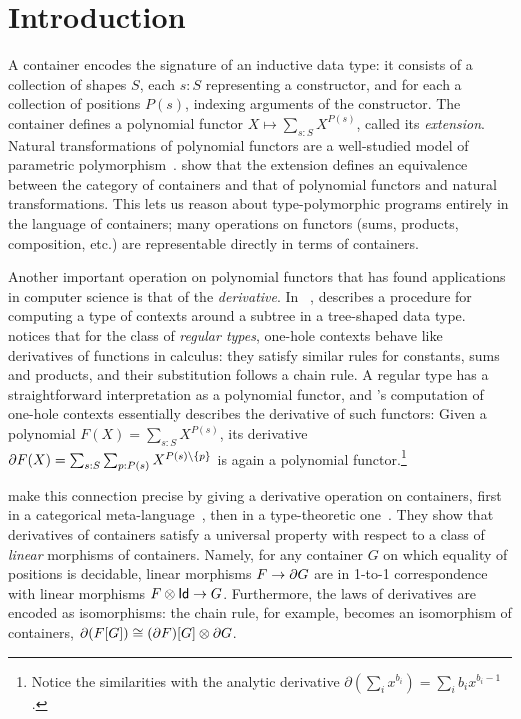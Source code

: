 \section{Introduction}

A container \cite{AbbottEtAl2005ContainersConstructingstrictly} encodes the signature of an inductive data type:
it consists of a collection of shapes \( S \), each \( s : S \) representing a constructor,
and for each a collection of positions \( P(s) \), indexing arguments of the constructor.
The container defines a polynomial functor \( X \mapsto \sum_{s : S} X^{P(s)} \),
called its \emph{extension}.
Natural transformations of polynomial functors are a well-studied model of parametric polymorphism~\cite{BainbridgeEtAl1990Functorialpolymorphism}.
 show that
the extension defines an equivalence between the category of containers and that of polynomial functors and natural transformations.
This lets us reason about type-polymorphic programs entirely in the language of containers;
many operations on functors (sums, products, composition, etc.) are representable directly in terms of containers.

Another important operation on polynomial functors that has found applications in computer science is that of the \emph{derivative}.
In ~\cite{Huet1997Zipper}, \citeauthor{Huet1997Zipper} describes a procedure for computing a type of contexts around a subtree in a tree-shaped data type.
~\cite{McBride2001DerivativeRegularType}
notices that for the class of \emph{regular types}, one-hole contexts behave like derivatives of functions in calculus:
they satisfy similar rules for constants, sums and products, and their substitution follows a chain rule.
A regular type has a straightforward interpretation as a polynomial functor,
and \citeauthor{McBride2001DerivativeRegularType}'s computation of one-hole contexts essentially describes the derivative of such functors:
Given a polynomial \( F(X) = \sum_{s : S} X^{P(s)} \),
its derivative
\(
  \partial{F}(X) = \sum_{s : S} \sum_{p : P(s)} X^{P(s) \setminus \{ p \}}
\)
is again a polynomial functor.\footnote{%
  Notice the similarities with the analytic derivative \( \partial(\sum_i x^{b_i}) = \sum_i b_i x^{b_i - 1} \).
}

 make this connection precise by giving a derivative operation on containers,
first in a categorical meta-language~\cite{AbbottEtAl2003DerivativesContainers},
then in a type-theoretic one~\cite{AbbottEtAl2005DataDifferentiating}.
They show that derivatives of containers satisfy a universal property with respect to a class of \emph{linear}
morphisms of containers.
Namely, for any container \( G \) on which equality of positions is decidable,
linear morphisms \( F \to \partial{G} \) are in 1-to-1 correspondence with linear morphisms \( F \mathbin{\otimes} \mathsf{Id} \to G \).
Furthermore, the laws of derivatives are encoded as isomorphisms:
the chain rule, for example, becomes an isomorphism of containers,
\( \partial{(F\lbrack G\rbrack)} \cong (\partial{F})\lbrack G\rbrack \mathbin{\otimes} \partial{G} \).

